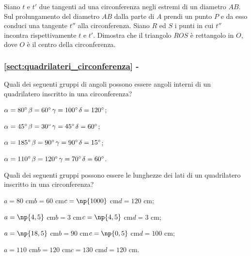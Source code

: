 \begin{multicols}{2}
\begin{esercizio}
\label{ese:5.40}
Siano $t$ e $t'$ due tangenti ad una circonferenza negli estremi di un diametro $AB$. Sul prolungamento del diametro $AB$ dalla parte di $A$ prendi un punto $P$ e da esso conduci una tangente $t''$ alla circonferenza. Siano $R$ ed $S$ i punti in cui $t''$ incontra rispettivamente $t$ e $t'$.  Dimostra che il triangolo $ROS$ è rettangolo in $O$, dove $O$ è il centro della circonferenza.
\end{esercizio}

\end{multicols}

\begingroup
\hypersetup{linkcolor=black}
\subsubsection*{\ref{sect:quadrilateri_circonferenza} - }
\endgroup

\begin{esercizio}
\label{ese:5.41}
Quali dei seguenti gruppi di angoli possono essere angoli interni di un quadrilatero inscritto in una circonferenza?
\begin{enumeratea}
\item $\alpha=80{}^{\circ}$\tab	$\beta=60{}^{\circ}$\tab $\gamma=100{}^{\circ}$\tab $\delta=120{}^{\circ}$;
\item $\alpha=45{}^{\circ}$\tab	$\beta=30{}^{\circ}$\tab $\gamma=45{}^{\circ}$\tab $\delta=60{}^{\circ}$;
\item $\alpha=185{}^{\circ}$\tab $\beta=90{}^{\circ}$\tab $\gamma=90{}^{\circ}$\tab $\delta=15{}^{\circ}$;
\item $\alpha=110{}^{\circ}$\tab $\beta=120{}^{\circ}$\tab $\gamma=70{}^{\circ}$\tab $\delta=60{}^{\circ}$.
\end{enumeratea}
\end{esercizio}

\begin{esercizio}
\label{ese:5.42}
Quali dei seguenti gruppi possono essere le lunghezze dei lati di un quadrilatero inscritto in una circonferenza?
\begin{enumeratea}
\item $a=80$ cm\tab	$b=60$ cm\tab $c=\np{1000}$ cm\tab $d=120$ cm;
\item $a=\np{4,5}$ cm\tab $b=3$ cm\tab $c=\np{4,5}$ cm\tab $d=3$ cm;
\item $a=\np{18,5}$ cm\tab $b=90$ cm\tab $c=\np{0,5}$ cm\tab $d=100$ cm;
\item $a=110$ cm\tab $b=120$ cm\tab $c=130$ cm\tab $d=120$ cm.
\end{enumeratea}
\end{esercizio}

